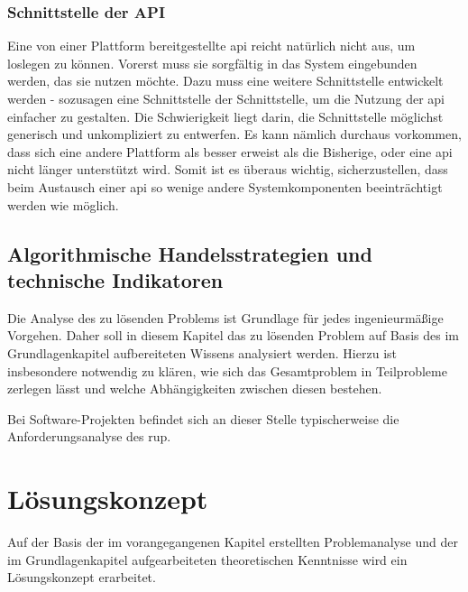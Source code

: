 \documentclass[oneside]{ausarbeitung}
\begin{document}
\subsection{Schnittstelle der API}
\label{sub:schnittstelle_der_api}

Eine von einer Plattform bereitgestellte \ac{api} reicht natürlich nicht aus, um loslegen zu können. Vorerst muss sie sorgfältig in das System eingebunden werden, das sie nutzen möchte. Dazu muss eine weitere Schnittstelle entwickelt werden - sozusagen eine Schnittstelle der Schnittstelle, um die Nutzung der \ac{api} einfacher zu gestalten. Die Schwierigkeit liegt darin, die Schnittstelle möglichst generisch und unkompliziert zu entwerfen. Es kann nämlich durchaus vorkommen, dass sich eine andere Plattform als besser erweist als die Bisherige, oder eine \ac{api} nicht länger unterstützt wird. Somit ist es überaus wichtig, sicherzustellen, dass beim Austausch einer \ac{api} so wenige andere Systemkomponenten beeinträchtigt werden wie möglich.


\section{Algorithmische Handelsstrategien und technische Indikatoren}
\label{sec:strategie_und_indikatoren}











Die Analyse des zu lösenden Problems ist Grundlage für jedes 
ingenieurmäßige Vorgehen. Daher soll in diesem Kapitel das zu lösenden 
Problem auf Basis des im Grundlagenkapitel aufbereiteten Wissens 
analysiert werden. Hierzu ist insbesondere notwendig zu klären, wie sich 
das Gesamtproblem in Teilprobleme zerlegen lässt und welche 
Abhängigkeiten zwischen diesen bestehen.

Bei Software-Projekten befindet sich an dieser Stelle typischerweise die 
Anforderungsanalyse des \ac{rup}.

\chapter{Lösungskonzept}
\label{cha:loesungskonzept}

Auf der Basis der im vorangegangenen Kapitel erstellten Problemanalyse 
und der im Grundlagenkapitel aufgearbeiteten theoretischen Kenntnisse 
wird ein Lösungskonzept erarbeitet.
\end{document}
